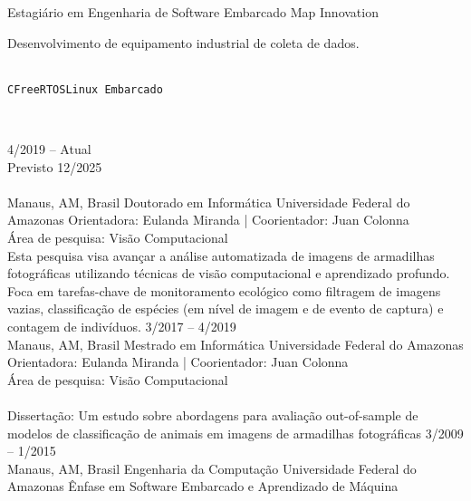 \documentclass[10pt]{developercv}
\begin{document}
\begin{entrylist}
  {Estagiário em Engenharia de Software Embarcado}
  {Map Innovation}
  {
  Desenvolvimento de equipamento industrial de coleta de dados.
    \begin{contributionlist}
    \end{contributionlist}\\
\texttt{C}\slashsep\texttt{FreeRTOS}\slashsep\texttt{Linux Embarcado}}
\\

\end{entrylist}


\begin{entrylist}
  \entry
  {4/2019 -- Atual\\\footnotesize{Previsto 12/2025 \\\\Manaus, AM, Brasil}}
  {Doutorado em Informática}
  {Universidade Federal do Amazonas}
  {Orientadora: Eulanda Miranda | Coorientador: Juan Colonna\\
  Área de pesquisa: Visão Computacional \\

  Esta pesquisa visa avançar a análise automatizada de imagens de armadilhas
fotográficas utilizando técnicas de visão computacional e aprendizado profundo.
Foca em tarefas-chave de monitoramento ecológico como filtragem de imagens
vazias, classificação de espécies (em nível de imagem e de evento de captura) e
contagem de indivíduos.
  }
  \entry
  {3/2017 -- 4/2019\\\footnotesize{Manaus, AM, Brasil}}
  {Mestrado em Informática}
  {Universidade Federal do Amazonas}
  {Orientadora: Eulanda Miranda | Coorientador: Juan Colonna\\
  Área de pesquisa: Visão Computacional\\\\
  Dissertação: Um estudo sobre abordagens para avaliação out-of-sample de
modelos de classificação de animais em imagens de armadilhas fotográficas}
  \entry
  {3/2009 -- 1/2015\\\footnotesize{Manaus, AM, Brasil}}
  {Engenharia da Computação}
  {Universidade Federal do Amazonas}
  {Ênfase em Software Embarcado e Aprendizado de Máquina}
\end{entrylist}
\end{document}
